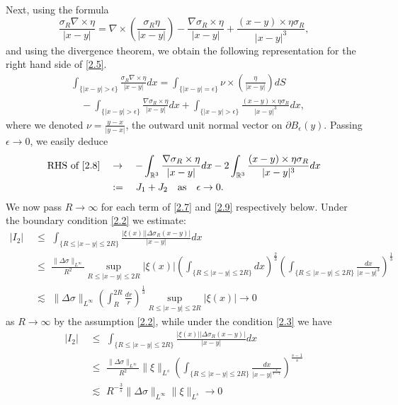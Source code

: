 \documentclass[12pt]{article}
\numberwithin{equation}{section}
\theoremstyle{definition}
\begin{document}
Next, using the formula
$$\frac{{\sigma}_{R}\nabla\times\eta}{|x-y|}=\nabla\times\left(\frac{{\sigma}_{R}\eta}{|x-y|}\right)-\frac{\nabla{\sigma}_R \times \eta}{|x-y|}
+\frac{(x-y)\times\eta{\sigma}_R}{|x-y|^3},$$
and using the divergence theorem, we obtain the following representation for the right hand side of \eqref{2.5}.
\begin{align}\label{2.8}
&\int_{\{|x-y|>\epsilon\}} \frac{{\sigma}_R\nabla\times\eta}{|x-y|}dx= \int_{\{|x-y|=\epsilon\}}\nu\times\left(\frac{\eta}{|x-y|}\right)dS\nonumber\\
&\quad -\int_{\{|x-y|>\epsilon\}}\frac{\nabla{\sigma}_R\times\eta}{|x-y|}dx+\int_{\{|x-y|>\epsilon\}} \frac{(x-y)\times\eta{\sigma}_R}{|x-y|^3}dx,
\end{align}
where we denoted $\nu=\frac{y-x}{|y-x|}$, the outward unit normal vector on $\partial B_{\epsilon}(y)$. Passing $\epsilon\rightarrow0$,
we easily deduce
\begin{align}\label{2.9}
\text{RHS of \eqref{2.8}}\quad&\rightarrow \quad- \int_{\mathbb{R}^3} \frac{\nabla{\sigma}_R\times\eta}{|x-y|}dx
-2\int_{\mathbb{R}^3}\frac{(x-y)\times\eta\sigma_{R}}{|x-y|^3}dx\nonumber\\
&:= \quad J_1 + J_2  \quad\text{as}\quad\epsilon\rightarrow0.
\end{align}
We now pass $R\rightarrow\infty$ for each term of \eqref{2.7} and \eqref{2.9} respectively below. Under the boundary
condition \eqref{2.2} we estimate:
\begin{align*}
|I_2|\,\,&\leq\,\, \int_{\{R\leq|x-y|\leq2R\}}\frac{|\xi(x)||\Delta{\sigma}_R(x-y)|}{|x-y|}dx\\
         &\leq\,\,\frac{\|\Delta{\sigma}\|_{L^{\infty}}}{R^2}\sup_{R\leq|x-y|\leq2R}|\xi(x)|
         \left(\int_{\{R\leq|x-y|\leq2R\}}dx\right)^{\frac{2}{3}}\left(\int_{\{R\leq|x-y|\leq2R\}}\frac{dx}{|x-y|^3}\right)^{\frac{1}{3}}\\
         & \lesssim \,\, \|\Delta{\sigma}\|_{L^{\infty}}\left(\int_{R}^{2R}\frac{dr}{r}\right)^{\frac{1}{3}}\sup_{R\leq|x-y|\leq2R}|\xi(x)|\rightarrow0
\end{align*}
as $R\rightarrow\infty$ by the assumption \eqref{2.2}, while under the condition \eqref{2.3} we have
\begin{align*}
|I_2|\,\,&\leq\,\, \int_{\{R\leq|x-y|\leq2R\}}\frac{|\xi(x)||\Delta{\sigma}_R(x-y)|}{|x-y|}dx\\
          &\leq\,\,\frac{\|\Delta{\sigma}\|_{L^{\infty}}}{R^2}\|\xi\|_{L^s} \left(\int_{\{R\leq|x-y|\leq2R\}}\frac{dx}{|x-y|^{\frac{s}{s-1}}}\right)^{\frac{s-1}{s}}\\
         & \lesssim \,\, R^{-\frac{3}{s}} \|\Delta{\sigma}\|_{L^{\infty}}\|\xi\|_{L^s}\rightarrow0
\end{align*}
\end{document}
